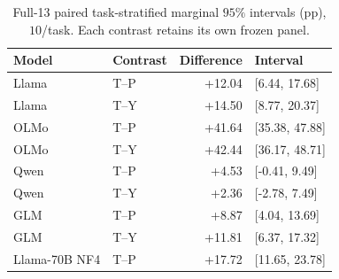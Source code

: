 \begin{table}[ht]
\centering\small
\caption{Full-13 paired task-stratified marginal $95\%$ intervals (pp), $10$/task. Each contrast retains its own frozen panel.}
\label{tab:full13-intervals}
\begin{tabular}{@{}llrl@{}}
\toprule
Model & Contrast & Difference & Interval \\
\midrule
Llama & T--P & +12.04 & [6.44, 17.68] \\
Llama & T--Y & +14.50 & [8.77, 20.37] \\
OLMo & T--P & +41.64 & [35.38, 47.88] \\
OLMo & T--Y & +42.44 & [36.17, 48.71] \\
Qwen & T--P & +4.53 & [-0.41, 9.49] \\
Qwen & T--Y & +2.36 & [-2.78, 7.49] \\
GLM & T--P & +8.87 & [4.04, 13.69] \\
GLM & T--Y & +11.81 & [6.37, 17.32] \\
Llama-70B NF4 & T--P & +17.72 & [11.65, 23.78] \\
\bottomrule
\end{tabular}
\end{table}

